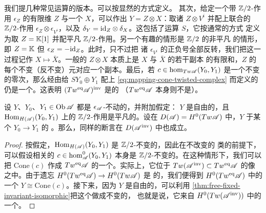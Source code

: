 我们提几种常见运算的\trEquivariant{}版本。\trDirectSum{}可以按显然的方式定义。
其次，给定一个带 $\mathbb{Z}/2$-作用 $\epsilon_Z$ 的有限维\trGraded\trVectorSpace{} $Z$
与一个\trEquivariant\trTwistedComplex{} $X$，可以作出\trEquivariant\trTensorProduct{}%
$Y=Z\otimes X$：取诸\trTensorProduct{} $Z\otimes V^i$ 并配上联合的 $\mathbb{Z}/2$-作用
$\epsilon_Z\otimes\epsilon_{V^i}$，以及\trDifferential{}%
$\delta_Y=\mathrm{id}_Z\otimes\delta_X$。这包括了\trSuspension{}运算 $S$，它按通常的方式
定义为取 $Z=\mathbb{K}[1]$ 并配平凡 $\mathbb{Z}/2$-作用。另一个有趣的情形是 $\mathbb{Z}/2$ 的非平凡%
\trCharacter{}的情形，即 $Z=\mathbb{K}$ 但 $\epsilon_Z=-\mathrm{id}_Z$。此时，\trTensorProduct{}只不过把
诸 $\epsilon_{V^i}$ 的正负号全部反转，我们把这一过程记作 $X\mapsto\bar{X}$。一般的%
\trTensorProduct{} $Z\otimes X$ 本质上是 $X$ 与 $\bar{X}$ 的若干\trSuspension{}副本
的有限和，$Z$ 的每个不变（反不变）\trBasis{}元对应一个副本。最后，若
$c\in\hom_{Tw\mathscr{A}}(Y_0,Y_1)$ 是一个不变的零次\trCocycle，那么经由给
$SY_0\oplus Y_1$ 配上\trDifferential{} \eqref{eq:mapping-cone-twisted-complex}
而定义的\trMappingCone{}仍是一个\trEquivariant\trTwistedComplex。这表明
$(Tw^{\mathrm{eq}}\mathscr{A})^{\mathrm{inv}}$ 是\trTriangulated{}的
（$Tw^{\mathrm{eq}}\mathscr{A}$ 本身则不是）。

\begin{lemma}\label{thm:equivariant-cone-isomorphism}
设 $Y$、$Y_0$、$Y_1\in\operatorname{Ob}\mathscr{A}$ 都是 $\epsilon_{\mathscr{A}}$-不动的，并附加假定：
$Y$ 是自由的，且 $\operatorname{Hom}_{H(\mathscr{A})}(Y_0,Y_1)$ 上的 $\mathbb{Z}/2$-作用是平凡的。设在
$D(\mathscr{A})=H^0(Tw\mathscr{A})$ 中，$Y$ \trIsomorphic{}于某个\trMorphism{} $Y_0\to Y_1$ 的%
\trCone。那么，同样的断言在 $D(\mathscr{A}^{\mathrm{inv}})$ 中也成立。
\end{lemma}

\begin{proof}
按假定，$\operatorname{Hom}_{H(\mathscr{A})}(Y_0,Y_1)$ 是 $\mathbb{Z}/2$-不变的，因此在不改变\trCone{}的%
\trIsomorphism{}类的前提下，可以假设相关的\trCocycle{}%
$c\in\hom^0_{\mathscr{A}}(Y_0,Y_1)$ 本身是 $\mathbb{Z}/2$-不变的。在这种情形下，我们可以把
$\mathrm{Cone}(c)$ 作成 $Tw^{\mathrm{eq}}\mathscr{A}$ 的一个\trObject。实际上，它位于%
\trEmbedding{} $Tw(\mathscr{A}^{\mathrm{inv}})\subset Tw^{\mathrm{eq}}\mathscr{A}$ 的像
之中。由于遗忘\trFunctor{} $H^0(Tw^{\mathrm{eq}}\mathscr{A})\to H^0(Tw\mathscr{A})$ 是%
\trFullyFaithful{}的，我们便得到 $H^0(Tw^{\mathrm{eq}}\mathscr{A})$ 中的一个%
\trIsomorphism{} $Y\cong\mathrm{Cone}(c)$。接下来，因为 $Y$ 是自由的，可以利用%
\cref{thm:free-fixed-invariant-isomorphic}把这个\trIsomorphism{}做成不变的，
也就是说，它来自
$H^0(Tw(\mathscr{A}^{\mathrm{inv}}))$ 中的一个\trIsomorphism。
\end{proof}

